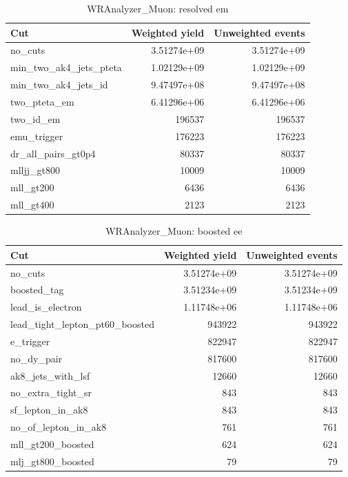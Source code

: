\documentclass{article}
\begin{document}
\begin{table}[htbp]
\centering
\caption{WRAnalyzer\_Muon: resolved em}
\begin{tabular}{lrr}
\hline
Cut & Weighted yield & Unweighted events \\
\hline
no\_cuts & 3.51274e+09 & 3.51274e+09 \\
min\_two\_ak4\_jets\_pteta & 1.02129e+09 & 1.02129e+09 \\
min\_two\_ak4\_jets\_id & 9.47497e+08 & 9.47497e+08 \\
two\_pteta\_em & 6.41296e+06 & 6.41296e+06 \\
two\_id\_em & 196537 & 196537 \\
emu\_trigger & 176223 & 176223 \\
dr\_all\_pairs\_gt0p4 & 80337 & 80337 \\
mlljj\_gt800 & 10009 & 10009 \\
mll\_gt200 & 6436 & 6436 \\
mll\_gt400 & 2123 & 2123 \\
\hline
\end{tabular}
\end{table}

\begin{table}[htbp]
\centering
\caption{WRAnalyzer\_Muon: boosted ee}
\begin{tabular}{lrr}
\hline
Cut & Weighted yield & Unweighted events \\
\hline
no\_cuts & 3.51274e+09 & 3.51274e+09 \\
boosted\_tag & 3.51234e+09 & 3.51234e+09 \\
lead\_is\_electron & 1.11748e+06 & 1.11748e+06 \\
lead\_tight\_lepton\_pt60\_boosted & 943922 & 943922 \\
e\_trigger & 822947 & 822947 \\
no\_dy\_pair & 817600 & 817600 \\
ak8\_jets\_with\_lsf & 12660 & 12660 \\
no\_extra\_tight\_sr & 843 & 843 \\
sf\_lepton\_in\_ak8 & 843 & 843 \\
no\_of\_lepton\_in\_ak8 & 761 & 761 \\
mll\_gt200\_boosted & 624 & 624 \\
mlj\_gt800\_boosted & 79 & 79 \\
\hline
\end{tabular}
\end{table}
\end{document}
